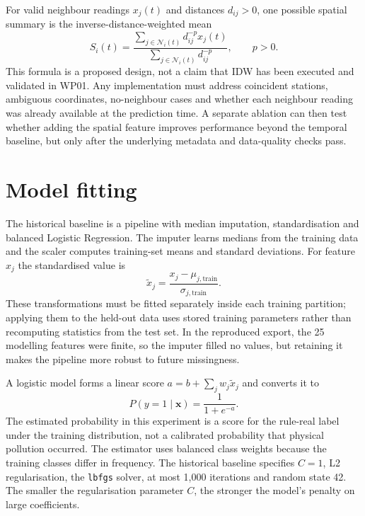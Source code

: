 \documentclass[12pt,a4paper,oneside]{report}
\begin{document}
For valid neighbour readings $x_j(t)$ and distances $d_{ij}>0$, one possible spatial summary is the inverse-distance-weighted mean
\begin{equation}\label{eq:idw}
S_i(t)=\frac{\sum_{j\in\mathcal{N}_i(t)}d_{ij}^{-p}x_j(t)}{\sum_{j\in\mathcal{N}_i(t)}d_{ij}^{-p}},\qquad p>0.
\end{equation}
This formula is a proposed design, not a claim that IDW has been executed and validated in WP01. Any implementation must address coincident stations, ambiguous coordinates, no-neighbour cases and whether each neighbour reading was already available at the prediction time. A separate ablation can then test whether adding the spatial feature improves performance beyond the temporal baseline, but only after the underlying metadata and data-quality checks pass.

\section{Model fitting}
The historical baseline is a pipeline with median imputation, standardisation and balanced Logistic Regression. The imputer learns medians from the training data and the scaler computes training-set means and standard deviations. For feature $x_j$ the standardised value is
\begin{equation}\tilde{x}_{j}=\frac{x_j-\mu_{j,\text{train}}}{\sigma_{j,\text{train}}}.\end{equation}
These transformations must be fitted separately inside each training partition; applying them to the held-out data uses stored training parameters rather than recomputing statistics from the test set. In the reproduced export, the 25 modelling features were finite, so the imputer filled no values, but retaining it makes the pipeline more robust to future missingness.

A logistic model forms a linear score $a=b+\sum_jw_j\tilde{x}_j$ and converts it to
\begin{equation}\label{eq:logit}P(y=1\mid\mathbf{x})=\frac{1}{1+e^{-a}}.\end{equation}
The estimated probability in this experiment is a score for the rule-real label under the training distribution, not a calibrated probability that physical pollution occurred. The estimator uses balanced class weights because the training classes differ in frequency. The historical baseline specifies $C=1$, L2 regularisation, the \texttt{lbfgs} solver, at most 1,000 iterations and random state 42. The smaller the regularisation parameter $C$, the stronger the model's penalty on large coefficients.
\end{document}

